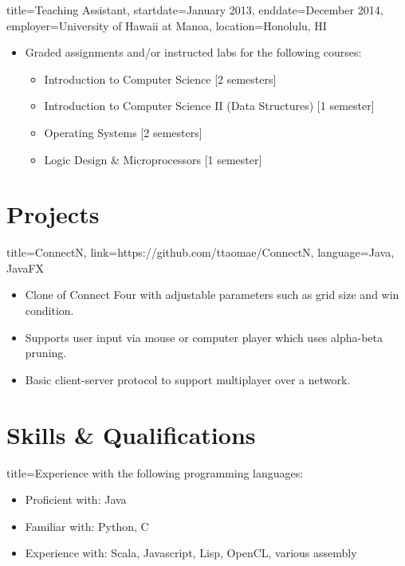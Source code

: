 \documentclass{resume}
\begin{document}
\begin{job}{title=Teaching Assistant,
            startdate=January 2013,
            enddate=December 2014,
            employer=University of Hawaii at Manoa,
            location={Honolulu, HI}}
    \begin{itemize}
        \item{Graded assignments and/or instructed labs for the following courses:}
        \begin{itemize}
            \item{Introduction to Computer Science [2 semesters]}
            \item{Introduction to Computer Science II (Data Structures) [1 semester]}
            \item{Operating Systems [2 semesters]}
            \item{Logic Design \& Microprocessors [1 semester]}
        \end{itemize}
    \end{itemize}
\end{job}

\section*{Projects}
\begin{project}{title=ConnectN,
            link=https://github.com/ttaomae/ConnectN,
            language={Java, JavaFX}}
    \begin{itemize}
        \item{Clone of Connect Four with adjustable parameters such as grid size and win condition.}
        \item{Supports user input via mouse or computer player which uses alpha-beta pruning.}
        \item{Basic client-server protocol to support multiplayer over a network.}
    \end{itemize}
\end{project}

\section*{Skills \& Qualifications}
\begin{skill}{title=Experience with the following programming languages:}
    \begin{itemize}
        \item{Proficient with: Java}
        \item{Familiar with: Python, C}
        \item{Experience with: Scala, Javascript, Lisp, OpenCL, various assembly}
    \end{itemize}
\end{skill}
\end{document}
